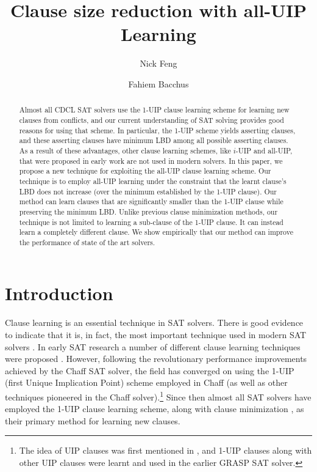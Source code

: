\documentclass[runningheads]{llncs}
\title{Clause size reduction with all-UIP Learning}
\author{Nick Feng \and Fahiem Bacchus}
\institute{Department of Computer Science, University of Toronto, Canada, 
  \email{\{fengnick,fbacchus\}@cs.toronto.edu}}
\newcommand{\sat}{SAT\xspace}
\newcommand{\nf}[1]{{\color{red}{#1}}}
\begin{document}
\maketitle              %
% 
\begin{abstract}
    Almost all CDCL \sat solvers use the 1-UIP 
    clause learning scheme for learning new clauses from conflicts, 
    and our current understanding
    of \sat solving provides good reasons for using that scheme. In
    particular, the 1-UIP scheme yields asserting clauses, and these
    asserting clauses have minimum LBD among all possible asserting
    clauses. As a result of these advantages, other clause learning
    schemes, like $i$-UIP and all-UIP, that were proposed in early
    work are not used in modern solvers. In this paper, we propose a
    new technique for exploiting the all-UIP clause learning scheme. 
    Our technique is to employ all-UIP learning under the
    constraint that the learnt clause's LBD does not increase (over the
    minimum established by the 1-UIP clause). Our method can learn
    clauses that are significantly smaller than the 1-UIP clause while
    preserving the minimum LBD. Unlike previous clause minimization
    methods, our technique is not limited to learning a sub-clause of
    the 1-UIP clause. It can instead learn a completely different
    clause. We show empirically 
    that our method can improve the performance of state of the art solvers.
\end{abstract}

\section{Introduction}
Clause learning is an essential technique in \sat solvers. There is good
evidence to indicate that it is, in fact, the most important technique
used in modern \sat solvers \cite{DBLP:conf/sat/KatebiSS11}. In early
\sat research \nf{,} a number of different clause learning techniques were
proposed
\cite{DBLP:conf/iccad/ZhangMMM01,DBLP:conf/iccad/SilvaS96,DBLP:journals/tc/Marques-SilvaS99,DBLP:conf/aaai/BayardoS97}.
However, following the revolutionary performance improvements achieved
by the Chaff \sat solver, the field has converged on using the 1-UIP
(first Unique Implication Point) scheme
\cite{DBLP:conf/iccad/ZhangMMM01} employed in Chaff
\cite{DBLP:conf/dac/MoskewiczMZZM01} (as well as other techniques
pioneered in the Chaff solver).\footnote{The idea of UIP clauses was
  first mentioned in \cite{DBLP:journals/tc/Marques-SilvaS99}, and
  1-UIP clauses along with other UIP clauses were learnt and used in
  the earlier GRASP \sat solver.} Since then almost all \sat solvers
have employed the 1-UIP clause learning scheme, along with clause
minimization \cite{DBLP:conf/sat/SorenssonB09}, as their primary
method for learning new clauses.
\end{document}
